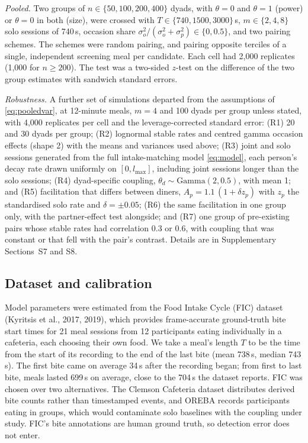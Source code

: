 \documentclass[12pt]{article}
\begin{document}
\emph{Pooled.} Two groups of $n\in\{50,100,200,400\}$ dyads, with $\theta=0$ and
$\theta=1$ (power) or $\theta=0$ in both (size), were crossed with
$T\in\{740,1500,3000\}$\,s, $m\in\{2,4,8\}$ solo sessions of 740\,s, occasion
share $\sigma_o^2/(\sigma_o^2+\sigma_p^2)\in\{0,0.5\}$, and two pairing schemes.
The schemes were random pairing, and pairing opposite terciles of a single,
independent screening meal per candidate. Each cell had 2{,}000 replicates (1{,}000
for $n\geq200$). The test was a two-sided $z$-test on the difference of the two
group estimates with sandwich standard errors.

\emph{Robustness.} A further set of simulations departed from the assumptions of
\eqref{eq:pooledvar}, at 12-minute meals, $m=4$ and 100 dyads per group unless
stated, with 4{,}000 replicates per cell and the leverage-corrected standard error:
(R1) 20 and 30 dyads per group; (R2) lognormal stable rates and centred gamma
occasion effects (shape 2) with the means and variances used above; (R3) joint and
solo sessions generated from the full intake-matching model \eqref{eq:model}, each
person's decay rate drawn uniformly on $[0,l_{\max}]$, including joint sessions
longer than the solo sessions; (R4) dyad-specific coupling,
$\theta_d\sim\mathrm{Gamma}(2,0.5)$, with mean 1; and (R5) facilitation that differs
between diners, $A_p=1.1\,(1+\delta z_p)$ with $z_p$ the standardised solo rate and
$\delta=\pm0.05$; (R6) the same facilitation in one group only, with the
partner-effect test alongside; and (R7) one group of pre-existing pairs whose
stable rates had correlation 0.3 or 0.6, with coupling that was constant or that
fell with the pair's contrast. Details are in Supplementary Sections~S7 and S8.

\subsection*{Dataset and calibration}

Model parameters were estimated from the Food Intake Cycle (FIC) dataset (Kyritsis
et al., 2017, 2019), which provides frame-accurate ground-truth bite start times for 21
meal sessions from 12 participants eating individually in a cafeteria, each
choosing their own food. We take a meal's length $T$ to be the time from the
start of its recording to the end of the last bite (mean 738\,s, median 743\,s).
The first bite came on average 34\,s after the recording began; from first to last
bite, meals lasted 699\,s on average, close to the 704\,s the dataset reports. FIC was
chosen over two alternatives. The Clemson Cafeteria dataset distributes derived
bite counts rather than timestamped events, and OREBA records participants eating
in groups, which would contaminate solo baselines with the coupling under study.
FIC's bite annotations are human ground truth, so detection error does not enter.
\end{document}
